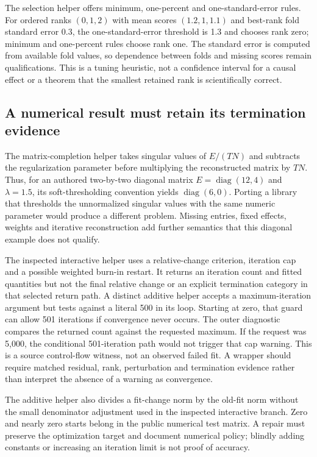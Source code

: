 The selection helper offers minimum, one-percent and one-standard-error
rules. For ordered ranks $(0,1,2)$ with mean scores $(1.2,1,1.1)$ and
best-rank fold standard error 0.3, the one-standard-error threshold is 1.3
and chooses rank zero; minimum and one-percent rules choose rank one.
The standard error is computed from available fold values, so dependence
between folds and missing scores remain qualifications. This is a tuning
heuristic, not a confidence interval for a causal effect or a theorem that
the smallest retained rank is scientifically correct.
\citep{exec24_fect_source,exec24_fect_choice}

\subsection{A numerical result must retain its termination evidence}
The matrix-completion helper takes singular values of $E/(TN)$ and
subtracts the regularization parameter before multiplying the reconstructed
matrix by $TN$. Thus, for an authored two-by-two diagonal matrix
$E=\operatorname{diag}(12,4)$ and $\lambda=1.5$, its soft-thresholding
convention yields $\operatorname{diag}(6,0)$. Porting a library that
thresholds the unnormalized singular values with the same numeric
parameter would produce a different problem. Missing entries, fixed
effects, weights and iterative reconstruction add further semantics that
this diagonal example does not qualify.\citep{exec24_fect_source,exec24_fect_choice}

The inspected interactive helper uses a relative-change criterion,
iteration cap and a possible weighted burn-in restart. It returns an
iteration count and fitted quantities but not the final relative change
or an explicit termination category in that selected return path. A
distinct additive helper accepts a maximum-iteration argument but tests
against a literal 500 in its loop. Starting at zero, that guard can allow
501 iterations if convergence never occurs. The outer diagnostic compares
the returned count against the requested maximum. If the request was
5,000, the conditional 501-iteration path would not trigger that cap
warning. This is a source control-flow witness, not an observed failed
fit. A wrapper should require matched residual, rank, perturbation and
termination evidence rather than interpret the absence of a warning as
convergence.\citep{exec24_fect_source,exec24_fect_choice}

The additive helper also divides a fit-change norm by the old-fit norm
without the small denominator adjustment used in the inspected
interactive branch. Zero and nearly zero starts belong in the public
numerical test matrix. A repair must preserve the optimization target and
document numerical policy; blindly adding constants or increasing an
iteration limit is not proof of accuracy.\citep{exec24_fect_source,exec24_fect_choice}

